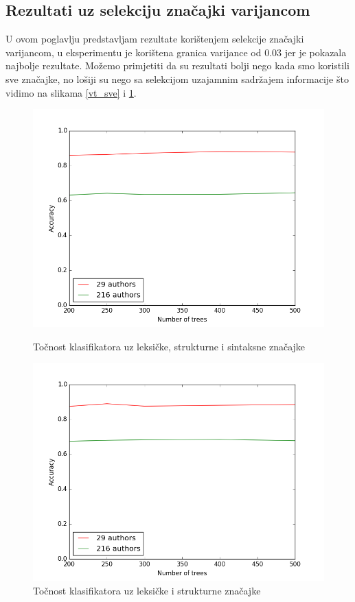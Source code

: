 \newpage

\subsection{Rezultati uz selekciju značajki varijancom}

U ovom poglavlju predstavljam rezultate korištenjem selekcije značajki varijancom, u eksperimentu je korištena granica varijance od $0.03$ jer je pokazala najbolje rezultate. Možemo primjetiti da su rezultati bolji nego kada smo koristili sve značajke, no lošiji su nego sa selekcijom uzajamnim sadržajem informacije što vidimo na slikama \ref{vt_sve} i \ref{vt_leksicke}.

\begin{figure}[htb]
  \centering
  \begin{minipage}[b]{0.4\textwidth}
    \includegraphics[width=\textwidth]{fig/vt_sve.png}
    \caption{Točnost klasifikatora uz leksičke, strukturne i sintaksne značajke}
    \label{vt_sve}
  \end{minipage}
  \hfill
  \begin{minipage}[b]{0.4\textwidth}
    \includegraphics[width=\textwidth]{fig/leksicke_vt.png}
    \caption{Točnost klasifikatora uz leksičke i strukturne značajke}
    \label{vt_leksicke}
  \end{minipage}
\end{figure}

